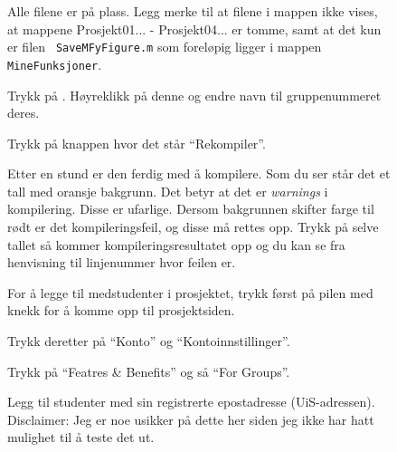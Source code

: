 \begin{figure}[H]
  \centering
  \vspace*{-30mm}
  \caption{Alle filene er på plass. Legg merke til at
    filene i mappen  ikke vises, at mappene
    Prosjekt01... - Prosjekt04... er tomme, samt at det kun er filen {\tt
      SaveMFyFigure.m} som foreløpig ligger i mappen {\tt MineFunksjoner}.} 
  \label{fig:bilde13a}
\end{figure}


\begin{figure}[H]
  \centering
   \hspace*{-30mm}
  \caption{Trykk på . Høyreklikk på denne og
    endre navn til gruppenummeret deres.} 
  \label{fig:bilde15}
\end{figure}

\begin{figure}[H]
  \centering
  \caption{Trykk på knappen hvor det står ``Rekompiler''. } 
  \label{fig:bilde16}
\end{figure}

\begin{figure}[H]
  \centering
  \caption{Etter en stund er den ferdig med å kompilere. Som du ser står det et tall med
    oransje bakgrunn. Det betyr at det er {\em warnings} i
    kompilering. Disse er ufarlige. Dersom bakgrunnen skifter
    farge til {\color{red}rødt} er det kompileringsfeil, og disse må rettes
    opp. Trykk på selve tallet så kommer kompileringsresultatet opp og
    du kan se fra henvisning til linjenummer hvor feilen er.} 
  \label{fig:bilde17}
\end{figure}

\begin{figure}[H]
  \centering
  \caption{For å legge til medstudenter i prosjektet, trykk først på
    pilen med knekk for å komme opp til prosjektsiden.} 
  \label{fig:bilde18}
\end{figure}

\begin{figure}[H]
  \centering
  \caption{Trykk deretter på ``Konto'' og ``Kontoinnstillinger''.} 
  \label{fig:bilde19}
\end{figure}


\begin{figure}[H]
  \centering
  \caption{Trykk på ``Featres \& Benefits'' og så ``For Groups''.} 
  \label{fig:bilde20}
\end{figure}


\begin{figure}[H]
  \centering
  \caption{Legg til studenter med sin registrerte epostadresse
    (UiS-adressen). Disclaimer: Jeg er noe usikker på dette
    her siden jeg ikke har hatt mulighet til å teste det ut.} 
  \label{fig:bilde21}
\end{figure}




